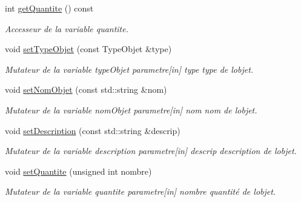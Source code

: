 \begin{DoxyCompactItemize}
int \hyperlink{class_objet_af58cf55dc5f3e8435c5499676ada3023}{get\+Quantite} () const
\begin{DoxyCompactList}\small\item\em Accesseur de la variable quantite. \end{DoxyCompactList}\item 
\mbox{\label{class_objet_a2183a02ee228f3ba1e52e0e5b9904dce}} 
void \hyperlink{class_objet_a2183a02ee228f3ba1e52e0e5b9904dce}{set\+Type\+Objet} (const Type\+Objet \&type)
\begin{DoxyCompactList}\small\item\em Mutateur de la variable type\+Objet parametre\mbox{[}in\mbox{]} type type de l\textquotesingle{}objet. \end{DoxyCompactList}\item 
\mbox{\label{class_objet_a666418b066069a2a5e35f88dc1f77f0f}} 
void \hyperlink{class_objet_a666418b066069a2a5e35f88dc1f77f0f}{set\+Nom\+Objet} (const std\+::string \&nom)
\begin{DoxyCompactList}\small\item\em Mutateur de la variable nom\+Objet parametre\mbox{[}in\mbox{]} nom nom de l\textquotesingle{}objet. \end{DoxyCompactList}\item 
\mbox{\label{class_objet_a6338766aaab5387afd5ac6fd311b132f}} 
void \hyperlink{class_objet_a6338766aaab5387afd5ac6fd311b132f}{set\+Description} (const std\+::string \&descrip)
\begin{DoxyCompactList}\small\item\em Mutateur de la variable description parametre\mbox{[}in\mbox{]} descrip description de l\textquotesingle{}objet. \end{DoxyCompactList}\item 
\mbox{\label{class_objet_a92eac9151b39f0a03a94ba02f25018c9}} 
void \hyperlink{class_objet_a92eac9151b39f0a03a94ba02f25018c9}{set\+Quantite} (unsigned int nombre)
\begin{DoxyCompactList}\small\item\em Mutateur de la variable quantite parametre\mbox{[}in\mbox{]} nombre quantité de l\textquotesingle{}objet. \end{DoxyCompactList}\item 
\mbox{\label{class_objet_a9e4b0fb73f3a95425f0239c91c7513f4}} 

\end{DoxyCompactItemize}

